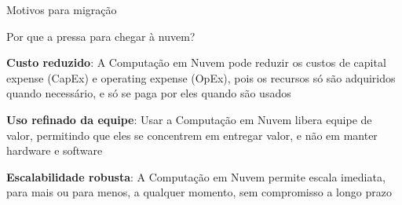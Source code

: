\begin{frame}{Motivos para migração}

    \begin{block}{Por que a pressa para chegar à nuvem?}
        
        
        \begin{itemise}
            \item<3-> \textbf{Custo reduzido}: A Computação em Nuvem pode reduzir os custos de capital expense (CapEx) e operating expense (OpEx), pois os recursos só são adquiridos quando necessário, e só se paga por eles quando são usados
            \item<4-> \textbf{Uso refinado da equipe}: Usar a Computação em Nuvem libera equipe de valor, permitindo que eles se concentrem em entregar valor, e não em manter hardware e software
            \item<5-> \textbf{Escalabilidade robusta}: A Computação em Nuvem permite escala imediata, para mais ou para menos, a qualquer momento, sem compromisso a longo prazo
        \end{itemise}
        
    \end{block}

    
    
\end{frame}


